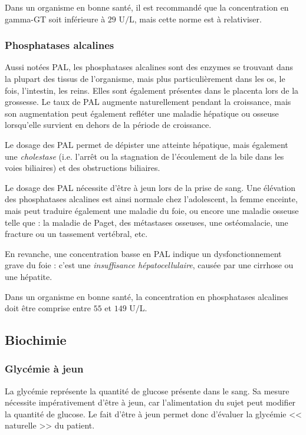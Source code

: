 \documentclass[12pt]{article}
\begin{document}
	Dans un organisme en bonne santé, il est recommandé que la concentration en gamma-GT soit inférieure à $29$ U$/$L, mais cette norme est à relativiser.
	
	\subsubsection{Phosphatases alcalines}
	Aussi notées PAL, les phosphatases alcalines sont des enzymes se trouvant dans la plupart des tissus de l'organisme, mais plus particulièrement dans les os, le fois, l'intestin, les reins. Elles sont également présentes dans le placenta lors de la grossesse. Le taux de PAL augmente naturellement pendant la croissance, mais son augmentation peut également refléter une maladie hépatique ou osseuse lorsqu'elle survient en dehors de la période de croissance.
	
	Le dosage des PAL permet de dépister une atteinte hépatique, mais également une \textit{cholestase} (i.e. l'arrêt ou la stagnation de l'écoulement de la bile dans les voies biliaires) et des obstructions biliaires.
	
	Le dosage des PAL nécessite d'être à jeun lors de la prise de sang. Une élévation des phosphatases alcalines est ainsi normale chez l'adolescent, la femme enceinte, mais peut traduire également une maladie du foie, ou encore une maladie osseuse telle que : la maladie de Paget, des métastases osseuses, une ostéomalacie, une fracture ou un tassement vertébral, etc.
	
	En revanche, une concentration basse en PAL indique un dysfonctionnement grave du foie : c'est une \textit{insuffisance hépatocellulaire}, causée par une cirrhose ou une hépatite.
	
	Dans un organisme en bonne santé, la concentration en phosphatases alcalines doit être comprise entre $55$ et $149$ U$/$L.
	
	\subsection{Biochimie}
		\subsubsection{Glycémie à jeun}
	La glycémie représente la quantité de glucose présente dans le sang. Sa mesure nécessite impérativement d'être à jeun, car l'alimentation du sujet peut modifier la quantité de glucose. Le fait d'être à jeun permet donc d'évaluer la glycémie << naturelle >> du patient. 
	
\end{document}
